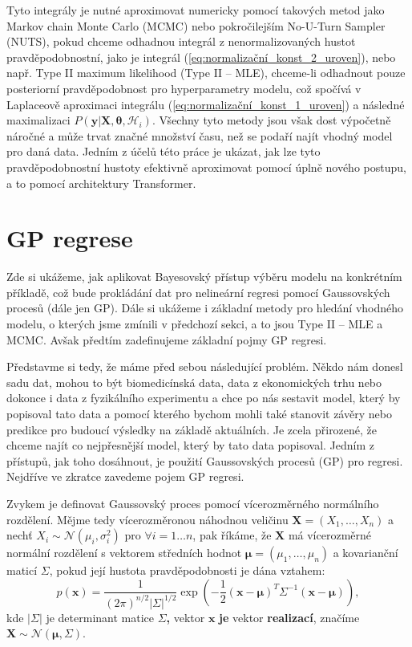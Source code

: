 Tyto integrály je nutné aproximovat numericky pomocí takových metod jako Markov chain Monte Carlo (MCMC) nebo pokročilejším No-U-Turn Sampler (NUTS), pokud chceme odhadnou integrál z nenormalizovaných hustot pravděpodobnostní, jako je integrál (\ref{eq:normalizační_konst_2_uroven}), nebo např. Type II maximum likelihood (Type II – MLE), chceme-li odhadnout pouze posteriorní pravděpodobnost pro hyperparametry modelu, což spočívá v Laplaceově aproximaci integrálu (\ref{eq:normalizační_konst_1_uroven}) a následné maximalizaci $P( \mathbf{y} | \mathbf{X}, \boldsymbol{\theta}, \mathcal{H}_i)$.
Všechny tyto metody jsou však dost výpočetně náročné a může trvat značné množství času, než se podaří najít vhodný model pro daná data.
Jedním z účelů této práce je ukázat, jak lze tyto pravděpodobnostní hustoty efektivně aproximovat pomocí úplně nového postupu, a to pomocí architektury Transformer.

\section{GP regrese}
Zde si ukážeme, jak aplikovat Bayesovský přístup výběru modelu na konkrétním příkladě, což bude prokládání dat pro nelineární regresi pomocí Gaussovských procesů (dále jen GP).
Dále si ukážeme i základní metody pro hledání vhodného modelu, o kterých jsme zmínili v předchozí sekci, a to jsou Type II – MLE a MCMC. 
Avšak předtím zadefinujeme základní pojmy GP regresi.
\par

Představme si tedy, že máme před sebou následující problém. 
Někdo nám donesl sadu dat, mohou to být biomedicínská data, data z ekonomických trhu nebo dokonce i data z fyzikálního experimentu a chce po nás sestavit model, který by popisoval tato data a pomocí kterého bychom mohli také stanovit závěry nebo predikce pro budoucí výsledky na základě aktuálních.
Je zcela přirozené, že chceme najít co nejpřesnější model, který by tato data popisoval.
Jedním z přístupů, jak toho dosáhnout, je použití Gaussovských procesů (GP) pro regresi.
Nejdříve ve zkratce zavedeme pojem GP regresi.
\par

Zvykem je definovat Gaussovský proces pomocí vícerozměrného normálního rozdělení.
Mějme tedy vícerozměronou náhodnou veličinu $\mathbf{X} = (X_1, \dots, X_n)$ a nechť $X_i \sim \mathcal{N}(\mu_i, \sigma_i^2)$ pro $\forall i = 1 \dots n$, pak říkáme, že $\mathbf{X}$ má vícerozměrné normální rozdělení s vektorem středních hodnot $\boldsymbol{\mu} = (\mu_1, \dots, \mu_n)$ a kovarianční maticí $\Sigma$, pokud její hustota pravděpodobnosti je dána vztahem:
\begin{equation}
  p(\mathbf{x}) = \frac{1}{(2\pi)^{n/2} |\Sigma|^{1/2}} \exp\left( -\frac{1}{2} (\mathbf{x} - \boldsymbol{\mu})^T \Sigma^{-1} (\mathbf{x} - \boldsymbol{\mu}) \right),
\label{eq:vicerozmernyGauss}
\end{equation}
kde $|\Sigma|$ je determinant matice $\Sigma$\textbf{,} vektor $\mathbf{x}$ \textbf{je} vektor \textbf{realizací}, značíme $\mathbf{X} \sim \mathcal{N}(\boldsymbol{\mu}, \Sigma)$.
\par

